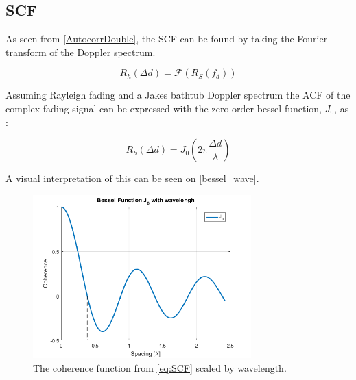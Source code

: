 



\subsection{\Gls{SCF}}
As seen from \autoref{AutocorrDouble}, the SCF can be found by taking the Fourier transform of the Doppler spectrum. 

\begin{equation}
R_{h}(\Delta d) = \mathcal{F}(R_{S}(f_d))
\end{equation}

Assuming Rayleigh fading and a Jakes bathtub Doppler spectrum the ACF of the complex fading signal can be expressed with the zero order bessel function, $J_0$, as \citep[p.329]{Jakes_microwave}:

\begin{equation}\label{eq:SCF}
R_h(\Delta d) = J_0\left(2\pi \frac{\Delta d}{\lambda}\right)
\end{equation}

A visual interpretation of this can be seen on \autoref{bessel_wave}.

\begin{figure}[H]
\centering
\includegraphics[width=0.75\textwidth]{figures/Bessel_wavlength.png}
\caption{The coherence function from \autoref{eq:SCF} scaled by wavelength.}
\label{bessel_wave}
\end{figure}

